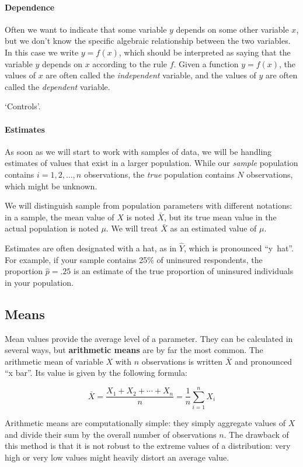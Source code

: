 \paragraph{Dependence} %
  Often we want to indicate that some variable $y$ depends on some other variable $x$, but we don’t know the specific algebraic relationship between the two variables. In this case we write $y = f(x)$, which should be interpreted as saying that the variable $y$ depends on $x$ according to the rule $f$. Given a function $y = f(x)$, the values of $x$ are often called the \emph{independent} variable, and the values of $y$ are often called the \emph{dependent} variable.%

  `Controls'.

\paragraph{Estimates}%
  As soon as we will start to work with samples of data, we will be handling estimates of values that exist in a larger population. While our \emph{sample} population contains $i = 1,2, \ldots, n$ observations, the \emph{true} population contains $N$ observations, which might be unknown.%

  We will distinguish sample from population parameters with different notations: in a sample, the mean value of $X$ is noted $\bar{X}$, but its true mean value in the actual population is noted $\mu$. We will treat $\bar{X}$ as an estimated value of $\mu$.%

  Estimates are often designated with a hat, as in $\hat{Y}$, which is pronounced ``y~hat''. For example, if your sample contains 25\% of uninsured respondents, the proportion $\hat{p} = .25$ is an estimate of the true proportion of uninsured individuals in your population.%

\subsection{Means}%

Mean values provide the average level of a parameter. They can be calculated in several ways, but \textbf{arithmetic means} are by far the most common. The arithmetic mean of variable $X$ with $n$ observations is written $\bar X$ and pronounced ``x bar''. Its value is given by the following formula:

$$\bar{X} = \frac{X_1 + X_2 + \cdots + X_n}{n} = \frac{1}{n}\sum_{i=1}^n X_i$$

Arithmetic means are computationally simple: they simply aggregate values of $X$ and divide their sum by the overall number of observations $n$. The drawback of this method is that it is not robust to the extreme values of a distribution: very high or very low values might heavily distort an average value.

